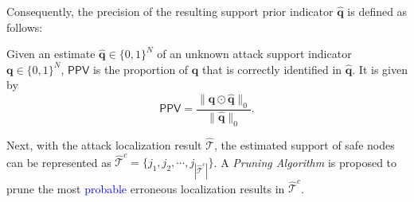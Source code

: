 Consequently, the precision of the resulting support prior indicator $\hat{\mathbf{q}}$ is defined as follows:
  \begin{definition}\label{Def:PPV_def}
Given an estimate $\hat{\mathbf{q}}\in\{0,1\}^{N}$ of an unknown attack support indicator $\mathbf{q}\in\{0,1\}^{N  }$, $\textsf{PPV}$ is the proportion of $\mathbf{q}$ that is correctly identified in $\hat{\mathbf{q}}$. It is given by
\begin{equation}\label{equ:PPV_def}
\textsf{PPV} =  \frac{\|\mathbf{q} \odot \hat{\mathbf{q}} \|_{0}}{\|\hat{\mathbf{q}}\|_{0}} .
\end{equation}
\end{definition}
 

Next, with the attack localization result $\hat{\mathcal{T}}$, the estimated support of safe nodes can be represented as $\hat{\mathcal{T}}^c = \{j_1, j_2,\cdots, j_{|\hat{\mathcal{T}}^c|}\}$. A \emph{Pruning Algorithm} is proposed to prune the most \textcolor{blue}{probable} erroneous localization results in $\hat{\mathcal{T}}^c$. 

